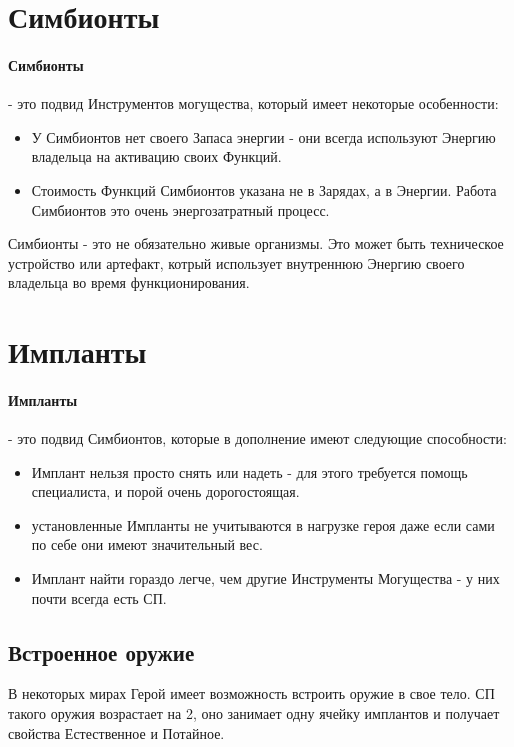 \section{Симбионты}
\paragraph{Симбионты} - это подвид Инструментов могущества, который имеет некоторые особенности:
\begin{itemize}
\item У Симбионтов нет своего Запаса энергии - они всегда используют Энергию владельца на активацию своих Функций.
\item Стоимость Функций Симбионтов указана не в Зарядах, а в Энергии. Работа Симбионтов это очень энергозатратный процесс.
\end{itemize}
\begin{tcolorbox}
Симбионты - это не обязательно живые организмы. Это может быть техническое устройство или артефакт, котрый использует внутреннюю Энергию своего владельца во время функционирования.
\end{tcolorbox}


\tbd
\section{Импланты}
\paragraph{Импланты} - это подвид Симбионтов, которые в дополнение имеют следующие способности:
\begin{itemize}
\item Имплант нельзя просто снять или надеть - для этого требуется помощь специалиста, и порой очень дорогостоящая.
\item установленные Импланты не учитываются в нагрузке героя даже если сами по себе они имеют значительный вес.
\item Имплант найти гораздо легче, чем другие Инструменты Могущества - у них почти всегда есть СП.
\end{itemize}

\subsection{Встроенное оружие}
В некоторых мирах Герой имеет возможность встроить оружие в свое тело. СП такого оружия возрастает на 2, оно занимает одну ячейку имплантов и получает свойства Естественное и Потайное.

